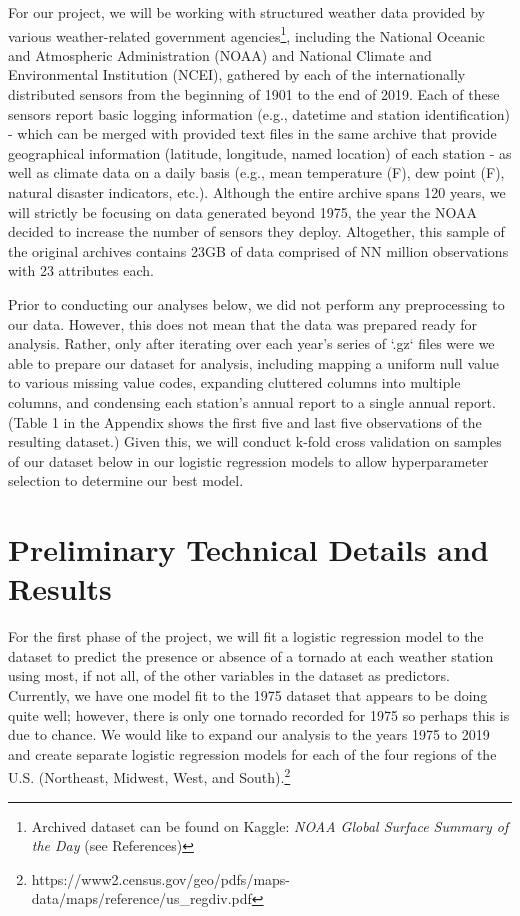 \documentclass[conference]{IEEEtran}
\begin{document}
For our project, we will be working with structured weather data provided by various weather-related government agencies\footnote{Archived dataset can be found on Kaggle: \textit{NOAA Global Surface Summary of the Day} (see References)}, including the National Oceanic and Atmospheric Administration (NOAA) and National Climate and Environmental Institution (NCEI), gathered by each of the internationally distributed sensors from the beginning of 1901 to the end of 2019. Each of these sensors report basic logging information (e.g., datetime and station identification) - which can be merged with provided text files in the same archive that provide geographical information (latitude, longitude, named location) of each station - as well as climate data on a daily basis (e.g., mean temperature (F), dew point (F), natural disaster indicators, etc.). Although the entire archive spans 120 years, we will strictly be focusing on data generated beyond 1975, the year the NOAA decided to increase the number of sensors they deploy. Altogether, this sample of the original archives contains 23GB of data comprised of NN million observations with 23 attributes each.

Prior to conducting our analyses below, we did not perform any preprocessing to our data. However, this does not mean that the data was prepared ready for analysis. Rather, only after iterating over each year's series of `.gz` files were we able to prepare our dataset for analysis, including mapping a uniform null value to various missing value codes, expanding cluttered columns into multiple columns, and condensing each station's annual report to a single annual report. (Table 1 in the Appendix shows the first five and last five observations of the resulting dataset.) Given this, we will conduct k-fold cross validation on samples of our dataset below in our logistic regression models to allow hyperparameter selection to determine our best model.

\section{Preliminary Technical Details and Results}


For the first phase of the project, we will fit a logistic regression model to the dataset to predict the presence or absence of a tornado at each weather station using most, if not all, of the other variables in the dataset as predictors. Currently, we have one model fit to the 1975 dataset that appears to be doing quite well; however, there is only one tornado recorded for 1975 so perhaps this is due to chance. We would like to expand our analysis to the years 1975 to 2019 and create separate logistic regression models for each of the four regions of the U.S. (Northeast, Midwest, West, and South).\footnote{https://www2.census.gov/geo/pdfs/maps-data/maps/reference/us\_regdiv.pdf} \\
\end{document}
